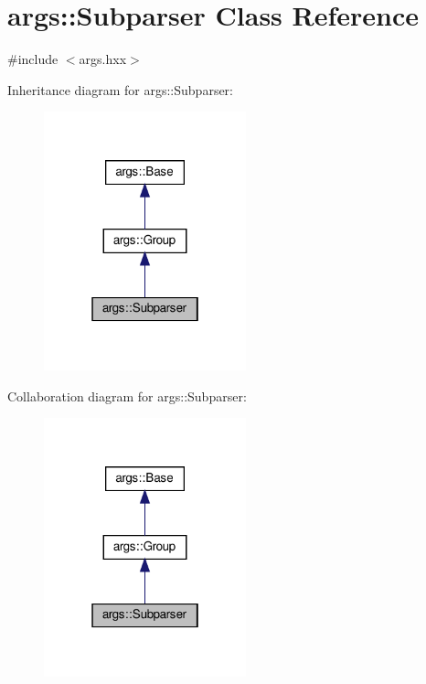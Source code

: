 \hypertarget{classargs_1_1_subparser}{}\section{args\+:\+:Subparser Class Reference}
\label{classargs_1_1_subparser}


{\ttfamily \#include $<$args.\+hxx$>$}



Inheritance diagram for args\+:\+:Subparser\+:\nopagebreak
\begin{figure}[H]
\begin{center}
\leavevmode
\includegraphics[width=166pt]{classargs_1_1_subparser__inherit__graph}
\end{center}
\end{figure}


Collaboration diagram for args\+:\+:Subparser\+:\nopagebreak
\begin{figure}[H]
\begin{center}
\leavevmode
\includegraphics[width=166pt]{classargs_1_1_subparser__coll__graph}
\end{center}
\end{figure}
